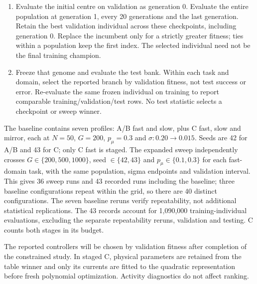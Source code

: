 \documentclass{styles/svproc}
\begin{document}
\begin{enumerate}
 \item Evaluate the initial centre on validation as generation 0. Evaluate the entire population at generation 1, every 20 generations and the last generation. Retain the best validation individual across these checkpoints, including generation 0. Replace the incumbent only for a strictly greater fitness; ties within a population keep the first index. The selected individual need not be the final training champion.
 \item Freeze that genome and evaluate the test bank. Within each task and domain, select the reported branch by validation fitness, not test success or error. Re-evaluate the same frozen individual on training to report comparable training/validation/test rows. No test statistic selects a checkpoint or sweep winner.
\end{enumerate}

The baseline contains seven profiles: A/B fast and slow, plus C fast, slow and mirror, each at $N=50$, $G=200$, $p_\mu=0.3$ and $\sigma:0.20\to0.015$. Seeds are 42 for A/B and 43 for C; only C fast is staged. The expanded sweep independently crosses $G\in\{200,500,1000\}$, seed $\in\{42,43\}$ and $p_\mu\in\{0.1,0.3\}$ for each fast-domain task, with the same population, sigma endpoints and validation interval. This gives 36 sweep runs and 43 recorded runs including the baseline; three baseline configurations repeat within the grid, so there are 40 distinct configurations. The seven baseline reruns verify repeatability, not additional statistical replications. The 43 records account for 1,090,000 training-individual evaluations, excluding the separate repeatability reruns, validation and testing. C counts both stages in its budget.

The reported controllers will be chosen by validation fitness after completion of the constrained study. In staged C, physical parameters are retained from the table winner and only its currents are fitted to the quadratic representation before fresh polynomial optimization. Activity diagnostics do not affect ranking.
\begin{table}[tbp]
\caption{Reported controllers and their fresh search budgets. Fast rows are validation winners from 12-run sweeps; slow/mirror rows are the fixed-budget baseline. All rows use $\sigma:0.20\to0.015$, validation every 20 generations, and no archived input. Staged C reports a local polynomial generation.}
\label{tab:protocols}
\centering\small
\end{table}
\end{document}
